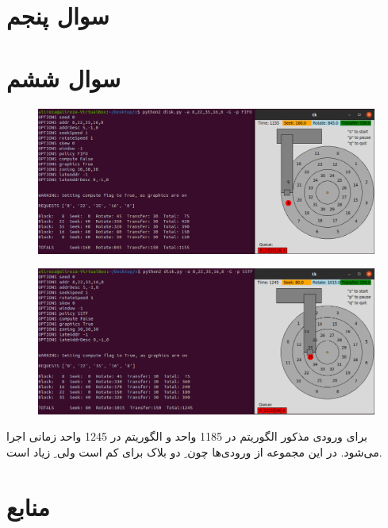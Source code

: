 \documentclass{article}
\begin{document}
\section{سوال پنجم}
\section{سوال ششم}
\begin{figure}[H]
    \centering
    \includegraphics[width=1\textwidth]{figures/6-a.png}
    \caption
	{
	}
    \label{fig:fig1}
\end{figure}
\begin{figure}[H]
    \centering
    \includegraphics[width=1\textwidth]{figures/6-b.png}
    \caption
	{
	}
    \label{fig:fig1}
\end{figure}
برای ورودی مذکور الگوریتم  در 1185 واحد و الگوریتم  در 1245 واحد زمانی اجرا می‌شود. در این مجموعه از ورودی‌ها چون ِ دو بلاک برای  کم است ولی ِ  زیاد است.



\section*{منابع}
\renewcommand{\section}[2]{}%
\begin{thebibliography}{99} %


\begin{LTRitems}

\resetlatinfont


\end{LTRitems}

\end{thebibliography}
\end{document}
